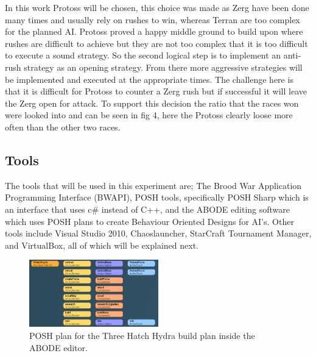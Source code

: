 \documentclass[journal]{IEEEtran}
\begin{document}
In this work Protoss will be chosen, this choice was made as Zerg have been done many times and usually rely on rushes to win, whereas Terran are too complex for the planned AI. Protoss proved a happy middle ground to build upon where rushes are difficult to achieve but they are not too complex that it is too difficult to execute a sound strategy. So the second logical step is to implement an anti-rush strategy as an opening strategy. From there more aggressive strategies will be implemented and executed at the appropriate times. The challenge here is that it is difficult for Protoss to counter a Zerg rush but if successful it will leave the Zerg open for attack. To support this decision the ratio that the races won were looked into and can be seen in fig 4, here the Protoss clearly loose more often than the other two races.

\subsection{Tools}
The tools that will be used in this experiment are; The Brood War Application Programming Interface (BWAPI), POSH tools, specifically POSH Sharp which is an interface that uses c\# instead of C++, and the ABODE editing software which uses POSH plans to create Behaviour Oriented Designs for AI's. Other tools include Visual Studio 2010, Chaoslauncher, StarCraft Tournament Manager, and VirtualBox, all of which will be explained next. 


\begin{figure}[H]
	\centering
	\includegraphics[width=0.5\textwidth]{POSH}
	\caption{POSH plan for the Three Hatch Hydra build plan inside the ABODE editor.}
	\label{Fig1}
\end{figure}
\end{document}

